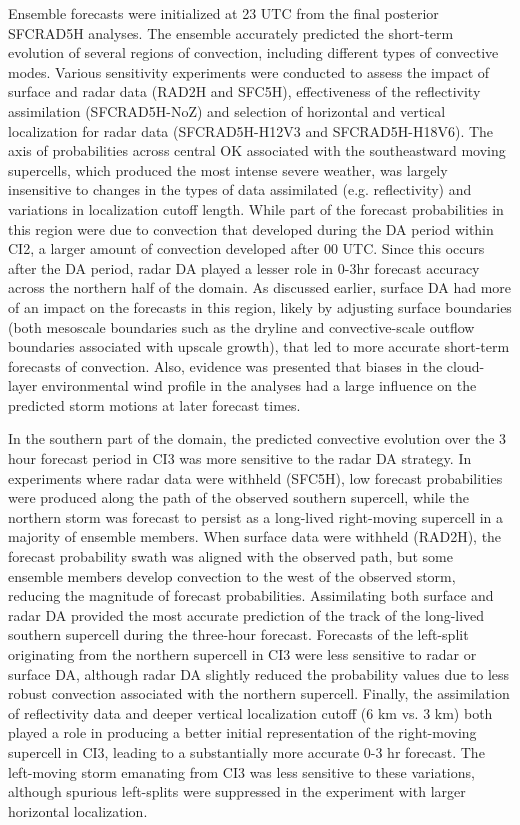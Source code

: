 Ensemble forecasts were initialized at 23 UTC from the final posterior SFCRAD5H analyses. The ensemble accurately predicted the short-term evolution of several regions of convection, including different types of convective modes. Various sensitivity experiments were conducted to assess the impact of surface and radar data (RAD2H and SFC5H), effectiveness of the reflectivity assimilation (SFCRAD5H-NoZ) and selection of horizontal and vertical localization for radar data (SFCRAD5H-H12V3 and SFCRAD5H-H18V6). The axis of probabilities across central OK associated with the southeastward moving supercells, which produced the most intense severe weather, was largely insensitive to changes in the types of data assimilated (e.g. reflectivity) and variations in localization cutoff length. While part of the forecast probabilities in this region were due to convection that developed during the DA period within CI2, a larger amount of convection developed after 00 UTC. Since this occurs after the DA period, radar DA played a lesser role in 0-3hr forecast accuracy across the northern half of the domain. As discussed earlier, surface DA had more of an impact on the forecasts in this region, likely by adjusting surface boundaries (both mesoscale boundaries such as the dryline and convective-scale outflow boundaries associated with upscale growth), that led to more accurate short-term forecasts of convection. Also, evidence was presented that biases in the cloud-layer environmental wind profile in the analyses had a large influence on the predicted storm motions at later forecast times. 

In the southern part of the domain, the predicted convective evolution over the 3 hour forecast period in CI3 was more sensitive to the radar DA strategy. In experiments where radar data were withheld (SFC5H), low forecast probabilities were produced along the path of the observed southern supercell, while the northern storm was forecast to persist as a long-lived right-moving supercell in a majority of ensemble members. When surface data were withheld (RAD2H), the forecast probability swath was aligned with the observed path, but some ensemble members develop convection to the west of the observed storm, reducing the magnitude of forecast probabilities. Assimilating both surface and radar DA provided the most accurate prediction of the track of the long-lived southern supercell during the three-hour forecast. Forecasts of the left-split originating from the northern supercell in CI3 were less sensitive to radar or surface DA, although radar DA slightly reduced the probability values due to less robust convection associated with the northern supercell. Finally, the assimilation of reflectivity data and deeper vertical localization cutoff (6 km vs. 3 km) both played a role in producing a better initial representation of the right-moving supercell in CI3, leading to a substantially more accurate 0-3 hr forecast. The left-moving storm emanating from CI3 was less sensitive to these variations, although spurious left-splits were suppressed in the experiment with larger horizontal localization.
